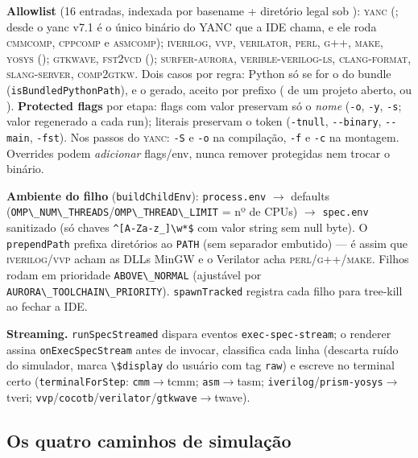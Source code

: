 \documentclass[11pt,a4paper,oneside]{article}
\newcommand{\tool}[1]{\textsc{#1}}
\newcommand{\code}[1]{\lstinline[basicstyle=\ttfamily]|#1|}
\begin{document}
\textbf{Allowlist} (16 entradas, indexada por basename + diretório legal sob ): \tool{yanc} (; desde o yanc v7.1 é o único binário do YANC que a IDE chama, e ele roda \tool{cmmcomp}, \tool{cppcomp} e \tool{asmcomp}); \tool{iverilog}, \tool{vvp}, \tool{verilator}, \tool{perl}, \tool{g++}, \tool{make}, \tool{yosys} (); \tool{gtkwave}, \tool{fst2vcd} (); \tool{surfer-aurora}, \tool{verible-verilog-ls}, \tool{clang-format}, \tool{slang-server}, \tool{comp2gtkw}. Dois casos por regra: Python só se for o do bundle (\code{isBundledPythonPath}), e o  gerado, aceito por prefixo ( de um projeto aberto, ou ). \textbf{Protected flags} por etapa: flags com valor preservam só o \emph{nome} (\code{-o}, \code{-y}, \code{-s}; valor regenerado a cada run); literais preservam o token (\code{-tnull}, \code{--binary}, \code{--main}, \code{-fst}). Nos passos do \tool{yanc}: \code{-S} e \code{-o} na compilação, \code{-f} e \code{-c} na montagem. Overrides podem \emph{adicionar} flags/env, nunca remover protegidas nem trocar o binário.

\textbf{Ambiente do filho} (\code{buildChildEnv}): \code{process.env} $\to$ defaults (\code{OMP\_NUM\_THREADS}/\code{OMP\_THREAD\_LIMIT} = nº de CPUs) $\to$ \code{spec.env} sanitizado (só chaves \lstinline|^[A-Za-z_]\w*$| com valor string sem null byte). O \code{prependPath} prefixa diretórios ao \code{PATH} (sem separador embutido) --- é assim que \tool{iverilog}/\tool{vvp} acham as DLLs MinGW e o Verilator acha \tool{perl}/\tool{g++}/\tool{make}. Filhos rodam em prioridade \code{ABOVE\_NORMAL} (ajustável por \code{AURORA\_TOOLCHAIN\_PRIORITY}). \code{spawnTracked} registra cada filho para tree-kill ao fechar a IDE.

\textbf{Streaming.} \code{runSpecStreamed} dispara eventos \code{exec-spec-stream}; o renderer assina \code{onExecSpecStream} antes de invocar, classifica cada linha (descarta ruído do simulador, marca \code{\$display} do usuário com tag \code{raw}) e escreve no terminal certo (\code{terminalForStep}: \code{cmm}$\to$tcmm; \code{asm}$\to$tasm; \code{iverilog}/\code{prism-yosys}$\to$tveri; \code{vvp}/\code{cocotb}/\code{verilator}/\code{gtkwave}$\to$twave).

\subsection{Os quatro caminhos de simulação}
\end{document}
